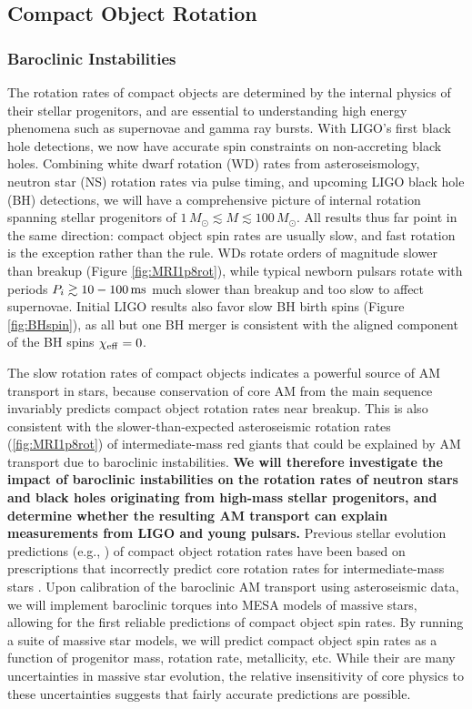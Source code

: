 {\color{orange}

\subsection{Compact Object Rotation}

}

\subsubsection{Baroclinic Instabilities}

The rotation rates of compact objects are determined by the internal physics of their stellar progenitors, and are essential to understanding high energy phenomena such as supernovae and gamma ray bursts. With LIGO's first black hole detections, we now have accurate spin constraints on non-accreting black holes. Combining white dwarf rotation (WD) rates from asteroseismology, neutron star (NS) rotation rates via pulse timing, and upcoming LIGO black hole (BH) detections, we will have a comprehensive picture of internal rotation spanning stellar progenitors of $1 \, M_\odot \! \lesssim \! M \! \lesssim \! 100 \, M_\odot$. All results thus far point in the same direction: compact object spin rates are usually slow, and fast rotation is the exception rather than the rule. WDs rotate orders of magnitude slower than breakup (Figure \ref{fig:MRI1p8rot}), while typical newborn pulsars rotate with periods $P_{i} \gtrsim 10-100 \, {\rm ms}$ \citep{faucher:06,igoshev:13,gullon:14} much slower than breakup and too slow to affect  supernovae. Initial LIGO results also favor slow BH birth spins (Figure \ref{fig:BHspin}), as all but one BH merger is consistent with the aligned component of the BH spins $\chi_{\rm eff} = 0$.


The slow rotation rates of compact objects indicates a powerful source of AM transport in stars, because conservation of core AM from the main sequence invariably predicts compact object rotation rates near breakup. This is also consistent with the slower-than-expected asteroseismic rotation rates (\ref{fig:MRI1p8rot}) of intermediate-mass red giants that could be explained by AM transport due to baroclinic instabilities. {\bf We will therefore investigate the impact of baroclinic instabilities on the rotation rates of neutron stars and black holes originating from high-mass stellar progenitors, and determine whether the resulting AM transport can explain measurements from LIGO and young pulsars.} Previous stellar evolution predictions (e.g., \citealt{heger:00}) of compact object rotation rates have been based on prescriptions that incorrectly predict core rotation rates for intermediate-mass stars \citep{cantiello:14}. Upon calibration of the baroclinic AM transport using asteroseismic data, we will implement baroclinic torques into MESA models of massive stars, allowing for the first reliable predictions of compact object spin rates. By running a suite of massive star models, we will predict compact object spin rates as a function of progenitor mass, rotation rate, metallicity, etc. While their are many uncertainties in massive star evolution, the relative insensitivity of core physics to these uncertainties suggests that fairly accurate predictions are possible.

